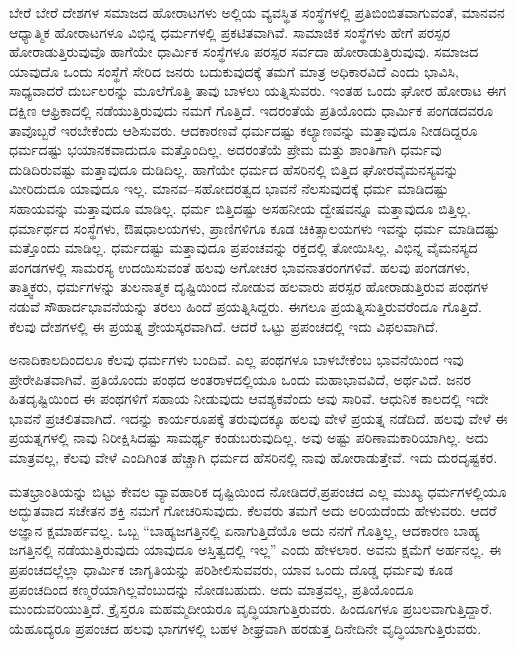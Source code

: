 
ಬೇರೆ ಬೇರೆ ದೇಶಗಳ ಸಮಾಜದ ಹೋರಾಟಗಳು ಅಲ್ಲಿಯ ವ್ಯವಸ್ಥಿತ ಸಂಸ್ಥೆಗಳಲ್ಲಿ ಪ್ರತಿಬಿಂಬಿತವಾಗುವಂತೆ, ಮಾನವನ ಆಧ್ಯಾತ್ಮಿಕ ಹೋರಾಟಗಳೂ ವಿಭಿನ್ನ ಧರ್ಮಗಳಲ್ಲಿ ಪ್ರಕಟಿತವಾಗಿವೆ. ಸಾಮಾಜಿಕ ಸಂಸ್ಥೆಗಳು ಹೇಗೆ ಪರಸ್ಪರ ಹೋರಾಡುತ್ತಿರುವುವೊ ಹಾಗೆಯೇ ಧಾರ್ಮಿಕ ಸಂಸ್ಥೆಗಳೂ ಪರಸ್ಪರ ಸರ್ವದಾ ಹೋರಾಡುತ್ತಿರುವುವು. ಸಮಾಜದ ಯಾವುದೊ ಒಂದು ಸಂಸ್ಥೆಗೆ ಸೇರಿದ ಜನರು ಬದುಕುವುದಕ್ಕೆ ತಮಗೆ ಮಾತ್ರ ಅಧಿಕಾರವಿದೆ ಎಂದು ಭಾವಿಸಿ, ಸಾಧ್ಯವಾದರೆ ದುರ್ಬಲರನ್ನು ಮೂಲೆಗೊತ್ತಿ ತಾವು ಬಾಳಲು ಯತ್ನಿಸುವರು. ಇಂತಹ ಒಂದು ಘೋರ ಹೋರಾಟ ಈಗ ದಕ್ಷಿಣ ಆಫ್ರಿಕಾದಲ್ಲಿ ನಡೆಯುತ್ತಿರುವುದು ನಮಗೆ ಗೊತ್ತಿದೆ. ಇದರಂತೆಯೆ ಪ್ರತಿಯೊಂದು ಧಾರ್ಮಿಕ ಪಂಗಡದವರೂ ತಾವೊಬ್ಬರೆ ಇರಬೇಕೆಂದು ಆಶಿಸುವರು. ಆದಕಾರಣವೆ ಧರ್ಮದಷ್ಟು ಕಲ್ಯಾಣವನ್ನು ಮತ್ತಾವುದೂ ನೀಡದಿದ್ದರೂ ಧರ್ಮದಷ್ಟು ಭಯಾನಕವಾದುದೂ ಮತ್ತೊಂದಿಲ್ಲ. ಅದರಂತೆಯೆ ಪ್ರೇಮ ಮತ್ತು ಶಾಂತಿಗಾಗಿ ಧರ್ಮವು ದುಡಿದಿರುವಷ್ಟು ಮತ್ತಾವುದೂ ದುಡಿದಿಲ್ಲ. ಹಾಗೆಯೇ ಧರ್ಮದ ಹೆಸರಿನಲ್ಲಿ ಬಿತ್ತಿದ ಘೋರವೈಮನಸ್ಯವನ್ನು ಮೀರಿದುದೂ ಯಾವುದೂ ಇಲ್ಲ. ಮಾನವ–ಸಹೋದರತ್ವದ ಭಾವನೆ ನೆಲಸುವುದಕ್ಕೆ ಧರ್ಮ ಮಾಡಿದಷ್ಟು ಸಹಾಯವನ್ನು ಮತ್ತಾವುದೂ ಮಾಡಿಲ್ಲ. ಧರ್ಮ ಬಿತ್ತಿದಷ್ಟು ಅಸಹನೀಯ ದ್ವೇಷವನ್ನೂ ಮತ್ತಾವುದೂ ಬಿತ್ತಿಲ್ಲ. ಧರ್ಮಾರ್ಥದ ಸಂಸ್ಥೆಗಳು, ಔಷಧಾಲಯಗಳು, ಪ್ರಾಣಿಗಳಿಗೂ ಕೂಡ ಚಿಕಿತ್ಸಾಲಯಗಳು ಇವನ್ನು ಧರ್ಮ ಮಾಡಿದಷ್ಟು ಮತ್ತೊಂದು ಮಾಡಿಲ್ಲ. ಧರ್ಮದಷ್ಟು ಮತ್ತಾವುದೂ ಪ್ರಪಂಚವನ್ನು ರಕ್ತದಲ್ಲಿ ತೋಯಿಸಿಲ್ಲ. ವಿಭಿನ್ನ ವೈಮನಸ್ಯದ ಪಂಗಡಗಳಲ್ಲಿ ಸಾಮರಸ್ಯ ಉದಯಿಸುವಂತೆ ಹಲವು ಅಗೋಚರ ಭಾವನಾತರಂಗಗಳಿವೆ. ಹಲವು ಪಂಗಡಗಳು, ತಾತ್ತ್ವಿಕರು, ಧರ್ಮಗಳನ್ನು ತುಲನಾತ್ಮಕ ದೃಷ್ಟಿಯಿಂದ ನೋಡುವ ಹಲವಾರು ಪರಸ್ಪರ ಹೋರಾಡುತ್ತಿರುವ ಪಂಥಗಳ ನಡುವೆ ಸೌಹಾರ್ದಭಾವನೆಯನ್ನು ತರಲು ಹಿಂದೆ ಪ್ರಯತ್ನಿಸಿದ್ದರು. ಈಗಲೂ ಪ್ರಯತ್ನಿಸುತ್ತಿರುವರೆಂದೂ ಗೊತ್ತಿದೆ. ಕೆಲವು ದೇಶಗಳಲ್ಲಿ ಈ ಪ್ರಯತ್ನ ಶ್ರೇಯಸ್ಕರವಾಗಿದೆ. ಆದರೆ ಒಟ್ಟು ಪ್ರಪಂಚದಲ್ಲಿ ಇದು ವಿಫಲವಾಗಿದೆ.


ಅನಾದಿಕಾಲದಿಂದಲೂ ಕೆಲವು ಧರ್ಮಗಳು ಬಂದಿವೆ. ಎಲ್ಲ ಪಂಥಗಳೂ ಬಾಳಬೇಕೆಂಬ ಭಾವನೆಯಿಂದ ಇವು ಪ್ರೇರೇಪಿತವಾಗಿವೆ. ಪ್ರತಿಯೊಂದು ಪಂಥದ ಅಂತರಾಳದಲ್ಲಿಯೂ ಒಂದು ಮಹಾಭಾವವಿದೆ, ಅರ್ಥವಿದೆ. ಜನರ ಹಿತದೃಷ್ಟಿಯಿಂದ ಈ ಪಂಥಗಳಿಗೆ ಸಹಾಯ ನೀಡುವುದು ಆವಶ್ಯಕವೆಂದು ಅವು ಸಾರಿವೆ. ಆಧುನಿಕ ಕಾಲದಲ್ಲಿ ಇದೇ ಭಾವನೆ ಪ್ರಚಲಿತವಾಗಿದೆ. ಇದನ್ನು ಕಾರ್ಯರೂಪಕ್ಕೆ ತರುವುದಕ್ಕೂ ಹಲವು ವೇಳೆ ಪ್ರಯತ್ನ ನಡೆದಿದೆ. ಹಲವು ವೇಳೆ ಈ ಪ್ರಯತ್ನಗಳಲ್ಲಿ ನಾವು ನಿರೀಕ್ಷಿಸಿದಷ್ಟು ಸಾಮರ್ಥ್ಯ ಕಂಡುಬರುವುದಿಲ್ಲ. ಅವು ಅಷ್ಟು ಪರಿಣಾಮಕಾರಿಯಾಗಿಲ್ಲ. ಅದು ಮಾತ್ರವಲ್ಲ, ಕೆಲವು ವೇಳೆ ಎಂದಿಗಿಂತ ಹೆಚ್ಚಾಗಿ ಧರ್ಮದ ಹೆಸರಿನಲ್ಲಿ ನಾವು ಹೋರಾಡುತ್ತೇವೆ. ಇದು ದುರದೃಷ್ಟಕರ.


ಮತಭ್ರಾಂತಿಯನ್ನು ಬಿಟ್ಟು ಕೇವಲ ವ್ಯಾವಹಾರಿಕ ದೃಷ್ಟಿಯಿಂದ ನೋಡಿದರೆ,\break ಪ್ರಪಂಚದ ಎಲ್ಲ ಮುಖ್ಯ ಧರ್ಮಗಳಲ್ಲಿಯೂ ಅದ್ಭುತವಾದ ಸಚೇತನ ಶಕ್ತಿ ನಮಗೆ ಗೋಚರಿಸುವುದು. ಕೆಲವರು ತಮಗೆ ಅದು ಅರಿಯದೆಂದು ಹೇಳುವರು. ಆದರೆ ಅಜ್ಞಾನ ಕ್ಷಮಾರ್ಹವಲ್ಲ. ಒಬ್ಬ “ಬಾಹ್ಯಜಗತ್ತಿನಲ್ಲಿ ಏನಾಗುತ್ತಿದೆಯೊ ಅದು ನನಗೆ ಗೊತ್ತಿಲ್ಲ, ಆದಕಾರಣ ಬಾಹ್ಯ ಜಗತ್ತಿನಲ್ಲಿ ನಡೆಯುತ್ತಿರುವುದು ಯಾವುದೂ ಅಸ್ತಿತ್ವದಲ್ಲಿ ಇಲ್ಲ” ಎಂದು ಹೇಳಲಾರ. ಅವನು ಕ್ಷಮೆಗೆ ಅರ್ಹನಲ್ಲ. ಈ ಪ್ರಪಂಚದಲ್ಲೆಲ್ಲಾ ಧಾರ್ಮಿಕ ಜಾಗೃತಿಯನ್ನು ಪರಿಶೀಲಿಸುವವರು, ಯಾವ ಒಂದು ದೊಡ್ಡ ಧರ್ಮವು ಕೂಡ ಪ್ರಪಂಚದಿಂದ ಕಣ್ಮರೆ\break ಯಾಗಿಲ್ಲವೆಂಬುದನ್ನು ನೋಡಬಹುದು. ಅದು ಮಾತ್ರವಲ್ಲ, ಪ್ರತಿಯೊಂದೂ ಮುಂದುವರಿಯುತ್ತಿದೆ. ಕ್ರೈಸ್ತರೂ ಮಹಮ್ಮದೀಯರೂ ವೃದ್ಧಿಯಾಗುತ್ತಿರುವರು. ಹಿಂದೂಗಳೂ ಪ್ರಬಲವಾಗುತ್ತಿದ್ದಾರೆ. ಯೆಹೂದ್ಯರೂ ಪ್ರಪಂಚದ ಹಲವು ಭಾಗಗಳಲ್ಲಿ ಬಹಳ ಶೀಘ್ರವಾಗಿ ಹರಡುತ್ತ ದಿನೇದಿನೇ ವೃದ್ಧಿಯಾಗುತ್ತಿರುವರು.

